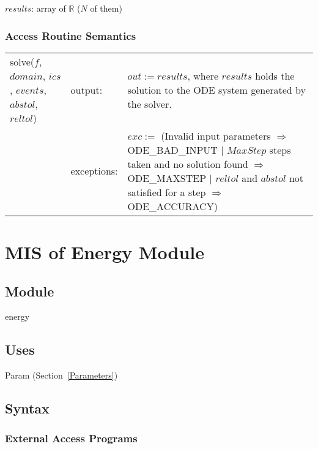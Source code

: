 \documentclass[12pt]{article}
\begin{document}
$results$: array of $\mathbb{R}$ ($N$ of them)

\subsubsection{Access Routine Semantics}

\begin{center}
\begin{tabular}{l l p{5cm}}
solve($f$, $domain$, $ics$, $events$, $abstol$, $reltol$) & output: & $out := results$, where $results$ holds the solution to the ODE system generated by the solver. \\
& exceptions: & $exc :=$ (Invalid input parameters $\Rightarrow$ ODE\_BAD\_INPUT $|$ $MaxStep$ steps taken and no solution found $\Rightarrow$ ODE\_MAXSTEP $|$ $reltol$ and $abstol$ not satisfied for a step $\Rightarrow$ ODE\_ACCURACY)  \\
\end{tabular}
\end{center}

\newpage
\section{MIS of Energy Module} \label{Energy}

\subsection{Module}

energy

\subsection{Uses}

Param (Section~\ref{Parameters})

\subsection{Syntax}

\subsubsection{External Access Programs}
\end{document}

